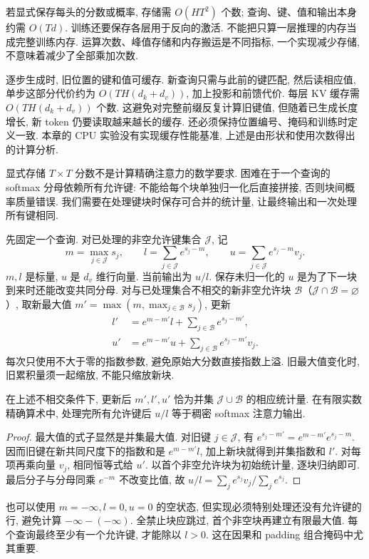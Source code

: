 若显式保存每头的分数或概率, 存储需 $O(HT^2)$ 个数; 查询、键、值和输出本身约需 $O(Td)$. 训练还要保存各层用于反向的激活. 不能把只算一层推理的内存当成完整训练内存. 运算次数、峰值存储和内存搬运是不同指标, 一个实现减少存储, 不意味着减少了全部乘加次数.

逐步生成时, 旧位置的键和值可缓存. 新查询只需与此前的键匹配, 然后读相应值, 单步这部分代价约为 $O(T H(d_k+d_v))$, 加上投影和前馈代价. 每层 KV 缓存需 $O(T H(d_k+d_v))$ 个数. 这避免对完整前缀反复计算旧键值, 但随着已生成长度增长, 新 token 仍要读取越来越长的缓存. 还必须保持位置编号、掩码和训练时定义一致. 本章的 CPU 实验没有实现缓存性能基准, 上述是由形状和使用次数得出的计算分析.

显式存储 $T\times T$ 分数不是计算精确注意力的数学要求. 困难在于一个查询的 softmax 分母依赖所有允许键: 不能给每个块单独归一化后直接拼接, 否则块间概率质量错误. 我们需要在处理键块时保存可合并的统计量, 让最终输出和一次处理所有键相同.

先固定一个查询. 对已处理的非空允许键集合 $\mathcal J$, 记
\[
m=\max_{j\in\mathcal J}s_j,\qquad
l=\sum_{j\in\mathcal J}e^{s_j-m},\qquad
u=\sum_{j\in\mathcal J}e^{s_j-m}v_j.
\]
$m,l$ 是标量, $u$ 是 $d_v$ 维行向量. 当前输出为 $u/l$. 保存未归一化的 $u$ 是为了下一块到来时还能改变共同分母. 对与已处理集合不相交的新非空允许块 $\mathcal B$（$\mathcal J\cap\mathcal B=\varnothing$）, 取新最大值
$m'=\max(m,\max_{j\in\mathcal B}s_j)$, 更新
\begin{align*}
l'&=e^{m-m'}l+\sum_{j\in\mathcal B}e^{s_j-m'},\\
u'&=e^{m-m'}u+\sum_{j\in\mathcal B}e^{s_j-m'}v_j.
\end{align*}
每次只使用不大于零的指数参数, 避免原始大分数直接指数上溢. 旧最大值变化时, 旧累积量须一起缩放, 不能只缩放新块.

\begin{proposition}
在上述不相交条件下, 更新后 $m',l',u'$ 恰为并集 $\mathcal J\cup\mathcal B$ 的相应统计量. 在有限实数精确算术中, 处理完所有允许键后 $u/l$ 等于稠密 softmax 注意力输出.
\end{proposition}
\begin{proof}
最大值的式子显然是并集最大值. 对旧键 $j\in\mathcal J$, 有
$e^{s_j-m'}=e^{m-m'}e^{s_j-m}$. 因而旧键在新共同尺度下的指数和是 $e^{m-m'}l$, 加上新块就得到并集指数和 $l'$. 对每项再乘向量 $v_j$, 相同恒等式给 $u'$. 以首个非空允许块为初始统计量, 逐块归纳即可. 最后分子与分母同乘 $e^{-m}$ 不改变比值, 故 $u/l=\sum_j e^{s_j}v_j/\sum_j e^{s_j}$.
\end{proof}
也可以使用 $m=-\infty,l=0,u=0$ 的空状态, 但实现必须特别处理还没有允许键的行, 避免计算 $-\infty-(-\infty)$. 全禁止块应跳过, 首个非空块再建立有限最大值. 每个查询最终至少有一个允许键, 才能除以 $l>0$. 这在因果和 padding 组合掩码中尤其重要.

